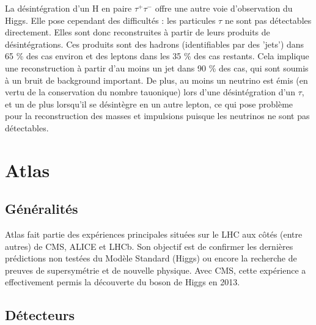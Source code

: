 \documentclass[11pt]{article} %
\begin{document}
La désintégration d'un H en paire $\tau^+ \tau^-$ offre une autre voie d'observation du Higgs. Elle pose cependant des difficultés : les particules $\tau$ ne sont pas détectables directement. Elles sont donc reconstruites à partir de leurs produits de désintégrations. Ces produits sont des hadrons (identifiables par des 'jets') dans 65 \% des cas environ et des leptons dans les 35 \% des cas restants. Cela implique une reconstruction à partir d'au moins un jet dans 90  \% des cas, qui sont soumis à un bruit de  background important. De plus, au moins un neutrino est émis (en vertu de la conservation du nombre tauonique) lors d'une désintégration d'un $\tau$, et un de plus lorsqu'il se désintègre en un autre lepton, ce qui pose problème pour la reconstruction des masses et impulsions puisque les neutrinos ne sont pas détectables.



%




\section{Atlas}

\subsection{Généralités}

Atlas fait partie des expériences principales situées sur le LHC aux côtés (entre autres) de CMS, ALICE et LHCb. Son objectif est de confirmer les dernières prédictions non testées du Modèle Standard (Higgs) ou encore la recherche de preuves de supersymétrie et de nouvelle physique. Avec CMS, cette expérience a effectivement permis la découverte du boson de Higgs en 2013.

\subsection{Détecteurs}
\end{document}
